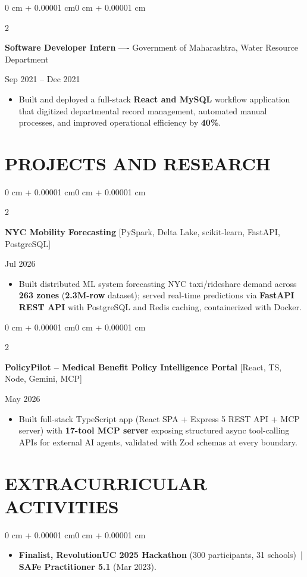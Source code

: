 \documentclass[10pt, letterpaper]{article}
\newenvironment{highlights}{
    \begin{itemize}[
        topsep=0.10 cm,
        parsep=0.06 cm,
        partopsep=0pt,
        itemsep=0.06 cm,
        leftmargin=12pt
    ]
}{
    \end{itemize}
}
\newenvironment{onecolentry}{
    \begin{adjustwidth}{0 cm + 0.00001 cm}{0 cm + 0.00001 cm}
}{
    \end{adjustwidth}
}
\newenvironment{twocolentry}[2][]{
    \onecolentry
    \def\secondColumn{#2}
    \setcolumnwidth{\fill, 4.5 cm}
    \begin{paracol}{2}
}{
    \switchcolumn \raggedleft \secondColumn
    \end{paracol}
    \endonecolentry
}
\begin{document}
\begin{twocolentry}{Sep 2021 -- Dec 2021}
\textbf{Software Developer Intern} ---- Government of Maharashtra, Water Resource Department
\end{twocolentry}
\begin{highlights}
  \item Built and deployed a full-stack \textbf{React and MySQL} workflow application that digitized departmental record management, automated manual processes, and improved operational efficiency by \textbf{40\%}.
\end{highlights}

\section{PROJECTS AND RESEARCH}
\begin{twocolentry}{Jul 2026}
\textbf{NYC Mobility Forecasting} [PySpark, Delta Lake, scikit-learn, FastAPI, PostgreSQL]
\end{twocolentry}
\begin{highlights}
  \item Built distributed ML system forecasting NYC taxi/rideshare demand across \textbf{263 zones} (\textbf{2.3M-row} dataset); served real-time predictions via \textbf{FastAPI REST API} with PostgreSQL and Redis caching, containerized with Docker.
\end{highlights}

\vspace{0.12 cm}

\begin{twocolentry}{May 2026}
\textbf{PolicyPilot -- Medical Benefit Policy Intelligence Portal} [React, TS, Node, Gemini, MCP]
\end{twocolentry}
\begin{highlights}
  \item Built full-stack TypeScript app (React SPA + Express 5 REST API + MCP server) with \textbf{17-tool MCP server} exposing structured async tool-calling APIs for external AI agents, validated with Zod schemas at every boundary.
\end{highlights}

\section{EXTRACURRICULAR ACTIVITIES}
\begin{onecolentry}
\begin{highlights}
  \item \textbf{Finalist, RevolutionUC 2025 Hackathon} (300 participants, 31 schools) \,|\, \textbf{SAFe Practitioner 5.1} (Mar 2023).
\end{highlights}
\end{onecolentry}
\end{document}
